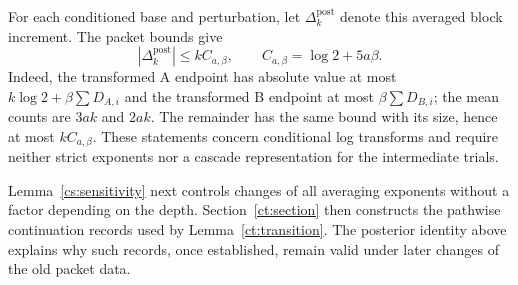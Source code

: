 For each conditioned base and perturbation, let $\Delta_k^{\mathrm{post}}$
denote this averaged block increment.  The packet bounds give
\begin{equation}
 |\Delta_k^{\mathrm{post}}|
 \le kC_{a,\beta},\qquad C_{a,\beta}=\log2+5a\beta.
 \label{ctr:block-bound}
\end{equation}
Indeed, the transformed A endpoint has absolute value at most
$k\log2+\beta\sum D_{A,i}$ and the transformed B endpoint at most
$\beta\sum D_{B,i}$; the mean counts are
$3ak$ and $2ak$.  The remainder has the same bound with its size, hence at
most $kC_{a,\beta}$.  These statements concern conditional log transforms
and require neither strict exponents nor a cascade representation for the
intermediate trials.

Lemma~\ref{cs:sensitivity} next controls changes of all averaging exponents
without a factor depending on the depth.  Section~\ref{ct:section} then
constructs the pathwise continuation records used by
Lemma~\ref{ct:transition}.  The posterior identity above explains why such
records, once established, remain valid under later changes of the old
packet data.
